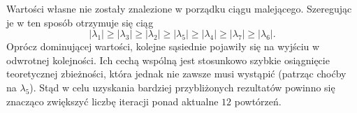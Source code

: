 Wartości własne nie zostały znalezione w porządku ciągu malejącego. Szeregując je w ten sposób otrzymuje się ciąg
\begin{equation}
|\lambda_1 | \geq |\lambda_3| \geq |\lambda_2|\geq |\lambda_5|\geq |\lambda_4|\geq |\lambda_7| \geq |\lambda_6|.
\end{equation}
Oprócz dominującej wartości, kolejne sąsiednie pojawiły się na wyjściu w odwrotnej kolejności. Ich cechą wspólną jest stosunkowo szybkie osiągnięcie teoretycznej zbieżności, która jednak nie zawsze musi wystąpić (patrząc choćby na $\lambda_5$). Stąd w celu uzyskania bardziej przybliżonych rezultatów powinno się znacząco zwiększyć liczbę iteracji ponad aktualne $12$ powtórzeń.



